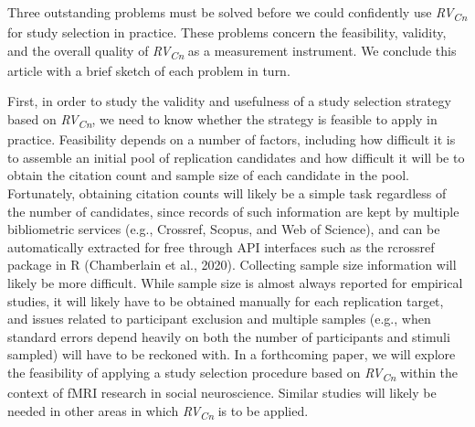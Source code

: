 \documentclass[
  english,
  jou,floatsintext]{apa6}
\begin{document}
Three outstanding problems must be solved before we could confidently use \emph{RV\textsubscript{Cn}} for study selection in practice. These problems concern the feasibility, validity, and the overall quality of \emph{RV\textsubscript{Cn}} as a measurement instrument. We conclude this article with a brief sketch of each problem in turn.

First, in order to study the validity and usefulness of a study selection strategy based on \emph{RV\textsubscript{Cn}}, we need to know whether the strategy is feasible to apply in practice. Feasibility depends on a number of factors, including how difficult it is to assemble an initial pool of replication candidates and how difficult it will be to obtain the citation count and sample size of each candidate in the pool. Fortunately, obtaining citation counts will likely be a simple task regardless of the number of candidates, since records of such information are kept by multiple bibliometric services (e.g., Crossref, Scopus, and Web of Science), and can be automatically extracted for free through API interfaces such as the rcrossref package in R (Chamberlain et al., 2020). Collecting sample size information will likely be more difficult. While sample size is almost always reported for empirical studies, it will likely have to be obtained manually for each replication target, and issues related to participant exclusion and multiple samples (e.g., when standard errors depend heavily on both the number of participants and stimuli sampled) will have to be reckoned with. In a forthcoming paper, we will explore the feasibility of applying a study selection procedure based on \emph{RV\textsubscript{Cn}} within the context of fMRI research in social neuroscience. Similar studies will likely be needed in other areas in which \emph{RV\textsubscript{Cn}} is to be applied.
\end{document}
